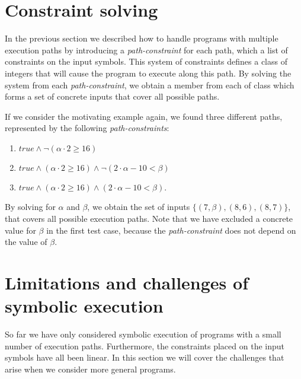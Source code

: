 		
\section{Constraint solving}
	
	In the previous section we described how to handle programs with multiple execution paths by introducing a \emph{path-constraint} for each path, which a list of constraints on the input symbols. This system of constraints defines a class of integers that will cause the program to execute along this path. By solving the system from each \emph{path-constraint}, we obtain a member from each of class which forms a set of concrete inputs that cover all possible paths.    
	
	If we consider the motivating example again, we found three different paths, represented by the following \emph{path-constraints}:
	\begin{enumerate}
		\item $true \land \neg (\alpha \cdot 2 \geq 16)$
		\item $true \land (\alpha \cdot 2 \geq 16) \land \neg (2\cdot \alpha - 10 < \beta)$
		\item $true \land (\alpha \cdot 2 \geq 16) \land (2\cdot \alpha - 10 < \beta)$.
	\end{enumerate}
	
	By solving for $\alpha$ and $\beta$, we obtain the set of inputs $\{(7, \beta), (8,6), (8, 7)\}$, that covers all possible execution paths. Note that we have excluded a concrete value for $\beta$ in the first test case, because the \emph{path-constraint} does not depend on the value of $\beta$. 
	 
\section{Limitations and challenges of symbolic execution}
	So far we have only considered symbolic execution of programs with a small number of execution paths. Furthermore, the constraints placed on the input symbols have all been linear.
	In this section we will cover the challenges that arise when we consider more general programs.
	
